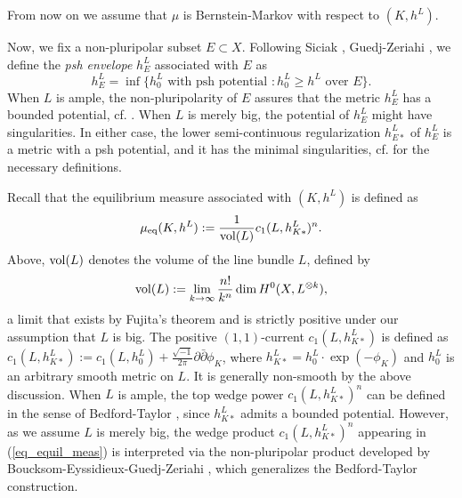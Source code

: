 \documentclass[12pt]{article}
\numberwithin{equation}{section}
\theoremstyle{theorem}
\theoremstyle{definition}
\theoremstyle{remark}
\newcommand{\imun} {\sqrt{-1}}
\begin{document}
	\par
	\begin{center}
		From now on we assume that $\mu$ is Bernstein-Markov with respect to $(K, h^L)$.
	\end{center}
	\par 
	Now, we fix a non-pluripolar subset $E \subset X$. 
	Following Siciak \cite{SiciakExtremal}, Guedj-Zeriahi \cite{GuedZeriGeomAnal}, we define the \textit{psh envelope} $h^L_{E}$ associated with $E$ as
	\begin{equation}\label{defn_env}
		h^L_E
		=
		\inf \Big\{
			h^L_0 \text{ with psh potential }: h^L_0 \geq h^L \text{ over } E
		\Big\}.
	\end{equation}
	When $L$ is ample, the non-pluripolarity of $E$ assures that the metric $h^L_E$ has a bounded potential, cf. \cite[Theorem 9.17]{GuedZeriGeomAnal}.
	When $L$ is merely big, the potential of $h^L_E$ might have singularities.
	In either case, the lower semi-continuous regularization $h^L_{E *}$ of $h^L_E$ is a metric with a psh potential, and it has the minimal singularities, cf. \cite[\S 1.2]{BermanBouckBalls} for the necessary definitions.
	\par 
	Recall that the equilibrium measure associated with $(K, h^L)$ is defined as
	\begin{equation}\label{eq_equil_meas}
		\mu_{\mathrm{eq}}(K, h^L) := \frac{1}{{\rm{vol}}(L)} c_1(L, h^L_{K *})^n.
	\end{equation}
	Above, ${\rm vol}(L)$ denotes the volume of the line bundle $L$, defined by
	\begin{equation}
		{\rm{vol}}(L) := \lim_{k \to \infty} \frac{n!}{k^n} \dim H^0(X, L^{\otimes k}),
	\end{equation}
	a limit that exists by Fujita’s theorem \cite{Fujita} and is strictly positive under our assumption that $L$ is big. 
	The positive $(1,1)$-current $c_1(L, h^L_{K *})$ is defined as $ c_1(L, h^L_{K *}) := c_1(L, h^L_0) + \frac{\imun}{2 \pi} \partial \bar{\partial} \phi_K$, where $h^L_{K *} = h^L_0 \cdot \exp(-\phi_K)$ and $h^L_0$ is an arbitrary smooth metric on $L$. 
	It is generally non-smooth by the above discussion.
	When $L$ is ample, the top wedge power $c_1(L, h^L_{K*})^n$ can be defined in the sense of Bedford-Taylor \cite{BedfordTaylor}, since $h^L_{K*}$ admits a bounded potential. 
	However, as we assume $L$ is merely big, the wedge product $c_1(L, h^L_{K*})^n$ appearing in (\ref{eq_equil_meas}) is interpreted via the non-pluripolar product developed by Boucksom-Eyssidieux-Guedj-Zeriahi \cite{BEGZ}, which generalizes the Bedford-Taylor construction. 
\end{document}
